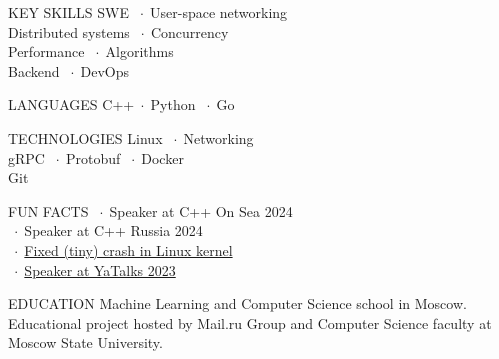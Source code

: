 \documentclass[12pt]{cutecv}
\author{Svyatoslav Feldsherov}
\newcommand{\listbullet}{$\; \cdot \;$}
\begin{document}
\maketitle

\begin{paracol}{2}
\setlength{\columnsep}{2em}
\setlength{\cvsectionverticalskip}{1mm}
\setlength{\cvinfoverticalskip}{1mm}

\begin{leftcolumn}
\begin{cvsection}{KEY SKILLS}
   SWE \listbullet User-space networking  \\
   Distributed systems \listbullet Concurrency  \\
   Performance \listbullet Algorithms \\
   Backend \listbullet DevOps 
\end{cvsection}

\begin{cvsection}{LANGUAGES}
  C++\listbullet Python \listbullet Go
\end{cvsection}

\begin{cvsection}{TECHNOLOGIES}
  Linux \listbullet Networking \\
  gRPC \listbullet Protobuf \listbullet Docker \\
  Git \\
\end{cvsection}

\begin{cvsection}{FUN FACTS}
  \listbullet Speaker at C++ On Sea 2024 \\
  \listbullet Speaker at C++ Russia 2024 \\
  \listbullet \href{https://lore.kernel.org/lkml/CACgs1VAo5AD-6sw2QCNKhRtoOy99XNP24dAWUrdryJKhCxwsMA@mail.gmail.com/}{Fixed (tiny) crash in Linux kernel} \\
  \listbullet \href{https://yatalks.yandex.ru/en/speakers/svyatoslav-feldsherov}{Speaker at YaTalks 2023} \\
\end{cvsection}

\begin{cvsection}{EDUCATION}
    {Machine Learning and Computer Science school in Moscow.}
   {Educational project hosted
    by Mail.ru Group and Computer Science faculty
    at Moscow State University.}
\end{cvsection}


\end{leftcolumn}
\end{paracol}
\end{document}
